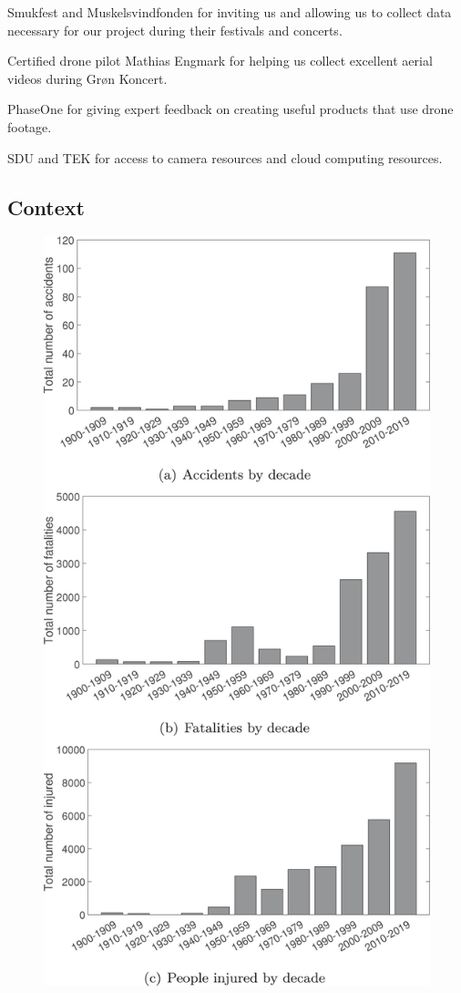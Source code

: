 \documentclass[
]{article}
\begin{document}
Smukfest and Muskelsvindfonden for inviting us and allowing us to
collect data necessary for our project during their festivals and
concerts.

Certified drone pilot Mathias Engmark for helping us collect excellent
aerial videos during Grøn Koncert.

PhaseOne for giving expert feedback on creating useful products that use
drone footage.

SDU and TEK for access to camera resources and cloud computing
resources.

\hypertarget{context}{%
\subsection{Context}\label{context}}

\begin{figure}

{\centering \includegraphics{../images/fatalities.jpg}

}
\end{figure}
\end{document}

